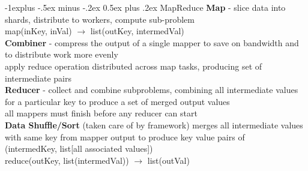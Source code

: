 \documentclass[10pt,landscape]{article}
\makeatletter
\renewcommand{\subsection}{\@startsection{subsection}{2}{0mm}%
                                {-1explus -.5ex minus -.2ex}%
                                {0.5ex plus .2ex}%
                                {\normalfont\normalsize\bfseries}}
\makeatother
\begin{document}
\begin{multicols}{3}
\subsection{MapReduce}
{\bf Map} - slice data into shards, distribute to workers, compute sub-problem\\
map(inKey, inVal) $\rightarrow$ list(outKey, intermedVal)\\
{\bf Combiner} - compress the output of a single mapper to save on bandwidth and to distribute work more evenly \\ 
apply reduce operation distributed across map tasks, producing set of intermediate pairs\\
{\bf Reducer} - collect and combine subproblems, combining all intermediate values for a particular key to produce a set of merged output values \\
all mappers must finish before any reducer can start\\
{\bf Data Shuffle/Sort} (taken care of by framework)
merges all intermediate values with same key from mapper output to produce key value pairs of \\
(intermedKey, list[all associated values])\\ 
reduce(outKey, list(intermedVal)) $\rightarrow$ list(outVal)\\


\end{multicols}
\end{document}

